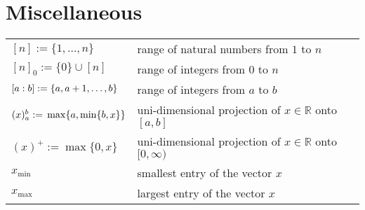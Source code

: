\section*{Miscellaneous}

\begin{tabularx}{\textwidth}{p{100pt}X}
    $[n] := \{1, \dots, n\}$ & range of natural numbers from $1$ to $n$ \\
    $[n]_0 := \{0\} \cup [n]$ & range of integers from $0$ to $n$ \\
    $[a : b] :=\newline \{a, a+1, \dots, b\}$ & range of integers from $a$ to $b$ \\
    $(x)_a^b :=\newline \max\{a, \min\{b, x\}\}$ & uni-dimensional projection of $x \in \mathbb{R}$ onto $[a,b]$ \\
    $(x)^+ := \max\{0, x\}$ & uni-dimensional projection of $x \in \mathbb{R}$ onto $[0, \infty)$ \\
    $x_{\text{min}}$ & smallest entry of the vector $x$ \\
    $x_{\text{max}}$ & largest entry of the vector $x$ \\
\end{tabularx}
